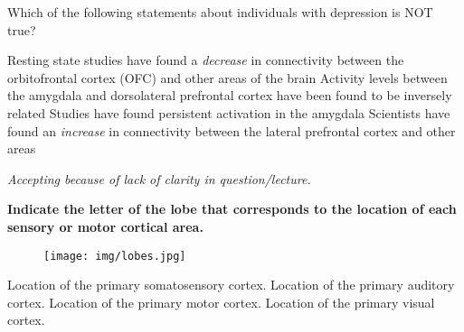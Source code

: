 \documentclass[answers]{exam}
\begin{document}
\begin{questions}
\question Which of the following statements about individuals with depression is NOT true?
\begin{choices}
\correctchoice Resting state studies have found a \emph{decrease} in connectivity between the orbitofrontal cortex (OFC) and other areas of the brain
\correctchoice Activity levels between the amygdala and dorsolateral prefrontal cortex have been found to be inversely related
\correctchoice Studies have found persistent activation in the amygdala
\correctchoice Scientists have found an \emph{increase} in connectivity between the lateral prefrontal cortex and other areas
\end{choices}
\emph{Accepting because of lack of clarity in question/lecture.}



\newpage

\textbf{Indicate the letter of the lobe that corresponds to the location of each sensory or motor cortical area.}

\begin{figure}[h]
\texttt{[image: img/lobes.jpg]}
\centering
\end{figure}

\question Location of the primary somatosensory cortex.
\question Location of the primary auditory cortex.
\question Location of the primary motor cortex.
\question Location of the primary visual cortex.


\end{questions}
\end{document}
